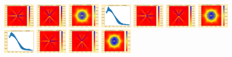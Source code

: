 \documentclass[11pt]{article}
\begin{document}
\includegraphics[width=0.11875\textwidth]{frame0021fig2.png}
\includegraphics[width=0.11875\textwidth]{frame0021fig3.png}
\vskip 10pt 
\includegraphics[width=0.11875\textwidth]{frame0022fig0.png}
\includegraphics[width=0.11875\textwidth]{frame0022fig1.png}
\includegraphics[width=0.11875\textwidth]{frame0022fig2.png}
\includegraphics[width=0.11875\textwidth]{frame0022fig3.png}
\includegraphics[width=0.11875\textwidth]{frame0023fig0.png}
\includegraphics[width=0.11875\textwidth]{frame0023fig1.png}
\includegraphics[width=0.11875\textwidth]{frame0023fig2.png}
\includegraphics[width=0.11875\textwidth]{frame0023fig3.png}
\vskip 10pt 
\includegraphics[width=0.11875\textwidth]{frame0024fig0.png}
\end{document}
